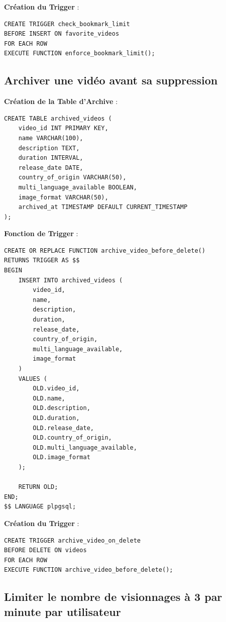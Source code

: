 \documentclass[a4paper,12pt]{article}
\begin{document}
\textbf{Création du Trigger} :

\begin{lstlisting}
CREATE TRIGGER check_bookmark_limit
BEFORE INSERT ON favorite_videos
FOR EACH ROW
EXECUTE FUNCTION enforce_bookmark_limit();
\end{lstlisting}

\subsection{Archiver une vidéo avant sa suppression}

\textbf{Création de la Table d'Archive} :

\begin{lstlisting}
CREATE TABLE archived_videos (
    video_id INT PRIMARY KEY,
    name VARCHAR(100),
    description TEXT,
    duration INTERVAL,
    release_date DATE,
    country_of_origin VARCHAR(50),
    multi_language_available BOOLEAN,
    image_format VARCHAR(50),
    archived_at TIMESTAMP DEFAULT CURRENT_TIMESTAMP
);
\end{lstlisting}

\textbf{Fonction de Trigger} :

\begin{lstlisting}
CREATE OR REPLACE FUNCTION archive_video_before_delete()
RETURNS TRIGGER AS $$
BEGIN
    INSERT INTO archived_videos (
        video_id, 
        name, 
        description, 
        duration, 
        release_date, 
        country_of_origin, 
        multi_language_available, 
        image_format
    )
    VALUES (
        OLD.video_id,
        OLD.name,
        OLD.description,
        OLD.duration,
        OLD.release_date,
        OLD.country_of_origin,
        OLD.multi_language_available,
        OLD.image_format
    );

    RETURN OLD;
END;
$$ LANGUAGE plpgsql;
\end{lstlisting}

\textbf{Création du Trigger} :

\begin{lstlisting}
CREATE TRIGGER archive_video_on_delete
BEFORE DELETE ON videos
FOR EACH ROW
EXECUTE FUNCTION archive_video_before_delete();
\end{lstlisting}

\subsection{Limiter le nombre de visionnages à 3 par minute par utilisateur}
\end{document}
